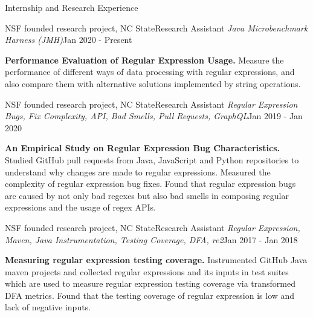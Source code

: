 \documentclass{professional} %
\begin{document}
\begin{rSection}{Internship and Research Experience}

\begin{rSubsection}{NSF founded research project, NC State}{Research Assistant}
{\it Java Microbenchmark Harness (JMH)}{Jan 2020 - Present}
\item{\bf Performance Evaluation of Regular Expression Usage.} 
Measure the performance of different ways of data processing with regular expressions, and also compare them with alternative solutions implemented by string operations.
\end{rSubsection}

\begin{rSubsection}{NSF founded research project, NC State}{Research Assistant}
{\it Regular Expression Bugs, Fix Complexity, API, Bad Smells, Pull Requests, GraphQL}{Jan 2019 - Jan 2020}
\item{\bf An Empirical Study on Regular Expression Bug Characteristics.} 
Studied GitHub pull requests from Java, JavaScript and Python repositories to understand why changes are made to regular expressions.
Measured the complexity of regular expression bug fixes. Found that regular expression bugs are caused by not only bad regexes but also bad smells in composing regular expressions and the usage of regex APIs. 
\end{rSubsection}

\begin{rSubsection}{NSF founded research project, NC State}{Research Assistant}
{\it Regular Expression, Maven, Java Instrumentation, Testing Coverage, DFA, re2}{Jan 2017 - Jan 2018}
\item{\bf Measuring regular expression testing coverage.} 
Instrumented GitHub Java maven projects and collected regular expressions and its inputs in test suites which are used to measure regular expression testing coverage via transformed DFA metrics. Found that the testing coverage of regular expression is low and lack of negative inputs.
\end{rSubsection}


\end{rSection}
\end{document}
